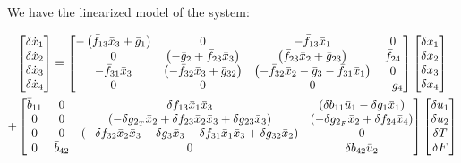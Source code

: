 We have the linearized model of the system:

\begin{multline}\label{eqn::lin_model}
    \begin{bmatrix} \delta \dot x_1 \\ \delta \dot x_2 \\ \delta \dot x_3 \\ \delta \dot x_4 \end{bmatrix} = \begin{bmatrix} -\left(  \bar f_{13} \bar x_3 + \bar g_1  \right) &
                    0 &
                    -\bar f_{13} \bar x_1 &
                    0 \\
                    0 &
                    \left(  -\bar g_2 + \bar f_{23} \bar x_3  \right)&
                    \left( \bar f_{23} \bar x_2 + \bar g_{23} \right)&
                    \bar f_{24} \\
                    -\bar f_{31} \bar x_3 &
                    \left( -\bar f_{32} \bar x_3 + \bar g_{32}  \right) &
                    \left( -\bar f_{32} \bar x_2 - \bar g_3 - \bar f_{31} \bar x_1  \right) &
                    0 \\
                    0 & 0 & 0 & -g_4
                     \end{bmatrix}
    \begin{bmatrix} \delta x_1 \\ \delta x_2 \\ \delta x_3 \\ \delta x_4 \end{bmatrix}\\
            +\begin{bmatrix}  \bar b_{11} &
                            0 &
                            \delta f_{13} \bar x_1 \bar x_3 &
                            \left( \delta b_{11} \bar u_1- \delta g_1 \bar x_1 \right)
                            \\
                        0&
                        0 &
                        \left( -\delta g_{2_T} \bar x_2 + \delta f_{23} \bar x_2 \bar x_3 + \delta g_{23} \bar x_3 \right) &
                        \left( -\delta g_{2_F} \bar x_2 + \delta f_{24} \bar x_4  \right)
                        \\
                        0&
                        0&
                        \left( -\delta f_{32} \bar x_2 \bar x_3 - \delta g_3 \bar x_3 - \delta f_{31} \bar x_1 \bar x_3 + \delta g_{32} \bar x_2  \right) &
                        0
                        \\
                        0&
                        \bar b_{42}&
                        0&
                        \delta b_{42} \bar u_2
                         \end{bmatrix}
    \begin{bmatrix} \delta u_1 \\ \delta u_2 \\ \delta T \\ \delta F \end{bmatrix}
\end{multline}
